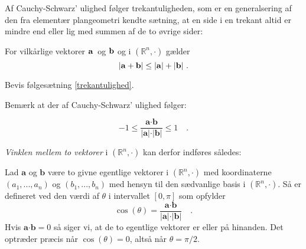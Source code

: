 Af Cauchy-Schwarz' ulighed følger trekantuligheden, som er en generalsering af den fra elementær plangeometri kendte sætning, at en side i en trekant altid er mindre end eller lig med summen af de to øvrige sider:

\begin{corollary}\label{trekantulighed}
For vilkårlige vektorer $\mathbf{a}\,$ og $\mathbf{b}$ og i $(\mathbb{R}^{n}, \bm{\cdot})$ gælder
\begin{equation}
\left|\mathbf{a}+\mathbf{b}\right|\leq \left|\mathbf{a}\right|+\left|\mathbf{b}\right|\,.
\end{equation}
\end{corollary}

\begin{exercise}
Bevis følgesætning \ref{trekantulighed}.
\end{exercise}

Bemærk at der af Cauchy-Schwarz' ulighed følger:

\begin{equation}
-1\leq \frac{\mathbf{a} \bm{\cdot} \mathbf{b}}{\vert \mathbf{a} \vert \cdot \vert \mathbf{b} \vert} \leq 1\quad.
\end{equation}

{\emph{Vinklen mellem to vektorer}} i $(\mathbb{R}^{n}, \bm{\cdot})$ kan derfor indføres således:

\begin{definition} \label{defVinkel}
Lad  $\mathbf{a}$ og $\mathbf{b}$ være to givne egentlige vektorer i $(\mathbb{R}^{n}, \bm{\cdot})$ med koordinaterne $(a_{1}, . . . , a_{n})$ og $(b_{1}, . . . , b_{n})$ med hensyn til den sædvanlige basis i $(\mathbb{R}^{n}, \bm{\cdot})$. Så er  defineret ved den værdi af $\theta$ i intervallet $[0, \pi]$ som opfylder
\begin{equation}
\cos(\theta) = \frac{\mathbf{a} \bm{\cdot} \mathbf{b}}{\vert \mathbf{a} \vert \cdot \vert \mathbf{b} \vert} \quad.
\end{equation}
Hvis $\mathbf{a} \bm{\cdot} \mathbf{b} = 0 $ så siger vi, at de to egentlige vektorer er  eller  på hinanden. Det optræder præcis når $\cos(\theta) = 0$, altså når $\theta = \pi/2$.
\end{definition}






